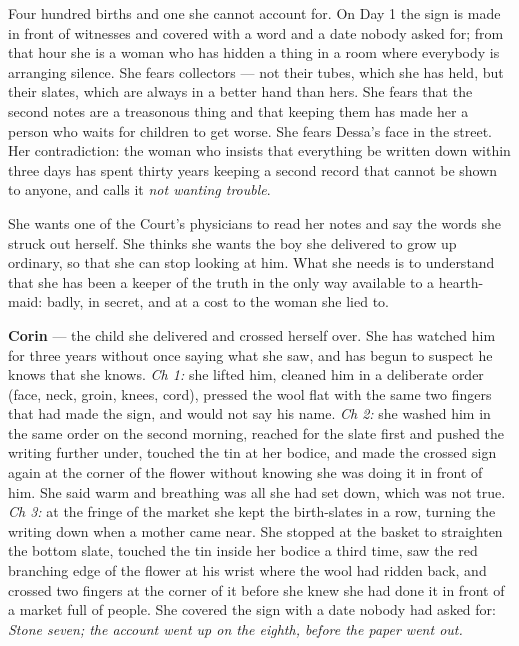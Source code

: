 \documentclass{design/chronicle}
\begin{document}
{
Four hundred births and one she cannot account for. On Day 1 the sign is made in front of witnesses and covered with a word and a date nobody asked for; from that hour she is a woman who has hidden a thing in a room where everybody is arranging silence. She fears collectors — not their tubes, which she has held, but their slates, which are always in a better hand than hers. She fears that the second notes are a treasonous thing and that keeping them has made her a person who waits for children to get worse. She fears Dessa’s face in the street. Her contradiction: the woman who insists that everything be written down within three days has spent thirty years keeping a second record that cannot be shown to anyone, and calls it \emph{not wanting trouble}.

She wants one of the Court’s physicians to read her notes and say the words she struck out herself. She thinks she wants the boy she delivered to grow up ordinary, so that she can stop looking at him. What she needs is to understand that she has been a keeper of the truth in the only way available to a hearth-maid: badly, in secret, and at a cost to the woman she lied to.

\textbf{Corin} — the child she delivered and crossed herself over. She has watched him for three years without once saying what she saw, and has begun to suspect he knows that she knows. \emph{Ch 1:} she lifted him, cleaned him in a deliberate order (face, neck, groin, knees, cord), pressed the wool flat with the same two fingers that had made the sign, and would not say his name. \emph{Ch 2:} she washed him in the same order on the second morning, reached for the slate first and pushed the writing further under, touched the tin at her bodice, and made the crossed sign again at the corner of the flower without knowing she was doing it in front of him. She said warm and breathing was all she had set down, which was not true. \emph{Ch 3:} at the fringe of the market she kept the birth-slates in a row, turning the writing down when a mother came near. She stopped at the basket to straighten the bottom slate, touched the tin inside her bodice a third time, saw the red branching edge of the flower at his wrist where the wool had ridden back, and crossed two fingers at the corner of it before she knew she had done it in front of a market full of people. She covered the sign with a date nobody had asked for: \emph{Stone seven; the account went up on the eighth, before the paper went out.}

}
\end{document}
